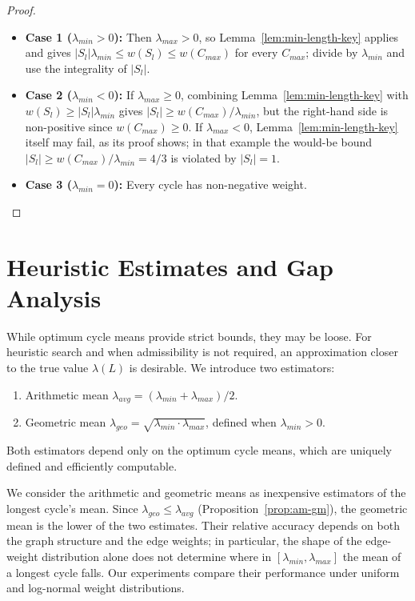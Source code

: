 \documentclass{article}
\theoremstyle{definition}
\begin{document}
\begin{proof}
\mbox{}\par
\begin{itemize}
\item \textbf{Case 1 ($\lambda_{min} > 0$):} Then $\lambda_{max} > 0$,
  so Lemma~\ref{lem:min-length-key} applies and gives
  $|S_l|\lambda_{min} \leq w(S_l) \leq w(C_{max})$ for every $C_{max}$;
  divide by $\lambda_{min}$ and use the integrality of $|S_l|$.
\item \textbf{Case 2 ($\lambda_{min} < 0$):} If $\lambda_{max} \geq
  0$, combining Lemma~\ref{lem:min-length-key} with $w(S_l) \geq
  |S_l|\lambda_{min}$ gives $|S_l| \geq w(C_{max})/\lambda_{min}$, but
  the right-hand side is non-positive since $w(C_{max}) \geq 0$. If
  $\lambda_{max} < 0$, Lemma~\ref{lem:min-length-key} itself may fail,
  as its proof shows; in that example the would-be bound $|S_l| \geq
  w(C_{max})/\lambda_{min} = 4/3$ is violated by $|S_l| = 1$.
\item \textbf{Case 3 ($\lambda_{min} = 0$):} Every cycle has
  non-negative weight.
\end{itemize}
\end{proof}

\section{Heuristic Estimates and Gap Analysis}
\label{sec:heuristic}

While optimum cycle means provide strict bounds, they may be
loose. For heuristic search and when admissibility is not required, an
approximation closer to the true value $\lambda(L)$ is desirable. We
introduce two estimators:
\begin{enumerate}
\item Arithmetic mean $\lambda_{avg} = (\lambda_{min}+\lambda_{max})/2$.
\item Geometric mean $\lambda_{geo} = \sqrt{\lambda_{min} \cdot
  \lambda_{max}}$, defined when $\lambda_{min} > 0$.
\end{enumerate}
Both estimators depend only on the optimum cycle means, which are
uniquely defined and efficiently computable.

We consider the arithmetic and geometric means as inexpensive
estimators of the longest cycle's mean. Since $\lambda_{geo} \leq
\lambda_{avg}$ (Proposition~\ref{prop:am-gm}), the geometric mean is
the lower of the two estimates. Their relative accuracy depends on
both the graph structure and the edge weights; in particular, the
shape of the edge-weight distribution alone does not determine where
in $[\lambda_{min}, \lambda_{max}]$ the mean of a longest cycle
falls. Our experiments compare their performance under uniform and
log-normal weight distributions.
\end{document}
